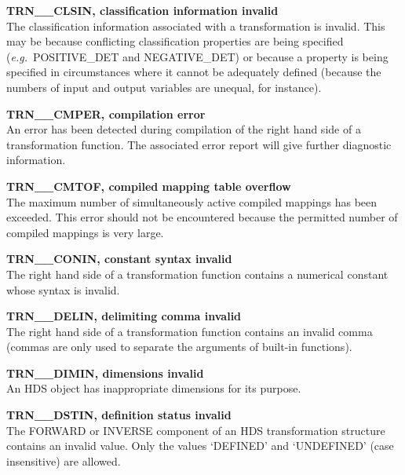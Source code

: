\documentclass[twoside,11pt]{article}
\newcommand{\name}[1]{\mbox{\small{#1}}}
\begin{document}
\begin{description}

\item \textbf{TRN\_\_CLSIN, classification information invalid}\\
The classification information associated with a transformation is invalid.
This may be because conflicting classification properties are being 
specified (\emph{e.g.}\ \name{POSITIVE\_DET} and \name{NEGATIVE\_DET}) or
because a property is being specified in circumstances where it cannot be
adequately defined (because the numbers of input and output variables
are unequal, for instance). 

\item \textbf{TRN\_\_CMPER, compilation error}\\
An error has been detected during compilation of the right hand side of a
transformation function. 
The associated error report will give further diagnostic information.

\item \textbf{TRN\_\_CMTOF, compiled mapping table overflow}\\
The maximum number of simultaneously active compiled mappings has
been exceeded.
This error should not be encountered because the permitted number of
compiled mappings is very large. 

\item \textbf{TRN\_\_CONIN, constant syntax invalid}\\
The right hand side of a transformation function contains a numerical
constant whose syntax is invalid. 

\item \textbf{TRN\_\_DELIN, delimiting comma invalid}\\
The right hand side of a transformation function contains an invalid comma
(commas are only used to separate the arguments of built-in functions). 

\item \textbf{TRN\_\_DIMIN, dimensions invalid}\\
An \name{HDS} object has inappropriate dimensions for its purpose. 

\item {\bf TRN\_\_DSTIN, definition status invalid}\\
The \name{FORWARD} or \name{INVERSE} component of an \name{HDS}
transformation structure contains an invalid value.
Only the values \name{`DEFINED'} and \name{`UNDEFINED'} (case insensitive)
are allowed. 


\end{description}
\end{document}
